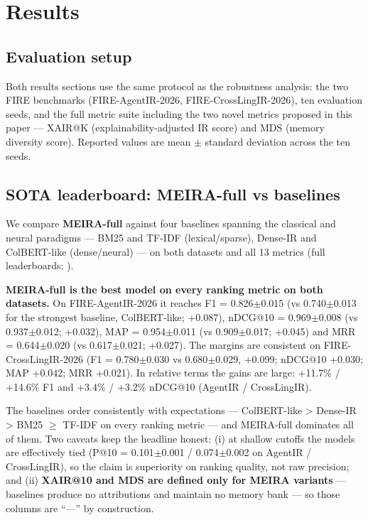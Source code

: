 \section{Results}
\label{sec:results}

\subsection*{Evaluation setup}

Both results sections use the same protocol as the robustness analysis: the two FIRE benchmarks (FIRE-AgentIR-2026, FIRE-CrossLingIR-2026), ten evaluation seeds, and the full metric suite including the two novel metrics proposed in this paper --- XAIR@K (explainability-adjusted IR score) and MDS (memory diversity score). Reported values are mean $\pm$ standard deviation across the ten seeds.

\subsection{SOTA leaderboard: MEIRA-full vs baselines}
\label{sec:results-sota}

We compare \textbf{MEIRA-full} against four baselines spanning the classical and neural paradigms --- BM25 and TF-IDF (lexical/sparse), Dense-IR and ColBERT-like (dense/neural) --- on both datasets and all 13 metrics (full leaderboards: ).

\textbf{MEIRA-full is the best model on every ranking metric on both datasets.} On FIRE-AgentIR-2026 it reaches F1 = 0.826$\pm$0.015 (vs 0.740$\pm$0.013 for the strongest baseline, ColBERT-like; +0.087), nDCG@10 = 0.969$\pm$0.008 (vs 0.937$\pm$0.012; +0.032), MAP = 0.954$\pm$0.011 (vs 0.909$\pm$0.017; +0.045) and MRR = 0.644$\pm$0.020 (vs 0.617$\pm$0.021; +0.027). The margins are consistent on FIRE-CrossLingIR-2026 (F1 = 0.780$\pm$0.030 vs 0.680$\pm$0.029, +0.099; nDCG@10 +0.030; MAP +0.042; MRR +0.021). In relative terms the gains are large: +11.7\% / +14.6\% F1 and +3.4\% / +3.2\% nDCG@10 (AgentIR / CrossLingIR).

The baselines order consistently with expectations --- ColBERT-like > Dense-IR > BM25 $\geq$ TF-IDF on every ranking metric --- and MEIRA-full dominates all of them. Two caveats keep the headline honest: (i) at shallow cutoffs the models are effectively tied (P@10 = 0.101$\pm$0.001 / 0.074$\pm$0.002 on AgentIR / CrossLingIR), so the claim is superiority on ranking quality, not raw precision; and (ii) \textbf{XAIR@10 and MDS are defined only for MEIRA variants} --- baselines produce no attributions and maintain no memory bank --- so those columns are ``---'' by construction.

